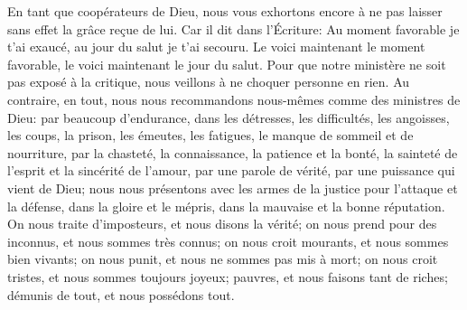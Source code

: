 En tant que coopérateurs de Dieu,
	nous vous exhortons encore à ne pas laisser sans effet la grâce reçue de lui.
Car il dit dans l’Écriture:
	Au moment favorable je t’ai exaucé, au jour du salut je t’ai secouru.
Le voici maintenant le moment favorable, le voici maintenant le jour du salut.
Pour que notre ministère ne soit pas exposé à la critique,
	nous veillons à ne choquer personne en rien.
Au contraire, en tout, nous nous recommandons nous-mêmes comme des ministres de Dieu:
	par beaucoup d’endurance, dans les détresses, les difficultés,
	les angoisses, les coups, la prison, les émeutes,
	les fatigues, le manque de sommeil et de nourriture,
	par la chasteté, la connaissance, la patience et la bonté,
		la sainteté de l’esprit et la sincérité de l’amour,
	par une parole de vérité, par une puissance qui vient de Dieu;
	nous nous présentons avec les armes de la justice pour l’attaque et la défense,
	dans la gloire et le mépris, dans la mauvaise et la bonne réputation.
On nous traite d’imposteurs, et nous disons la vérité;
	on nous prend pour des inconnus, et nous sommes très connus;
	on nous croit mourants, et nous sommes bien vivants;
	on nous punit, et nous ne sommes pas mis à mort;
	on nous croit tristes, et nous sommes toujours joyeux;
	pauvres, et nous faisons tant de riches;
	démunis de tout, et nous possédons tout.
